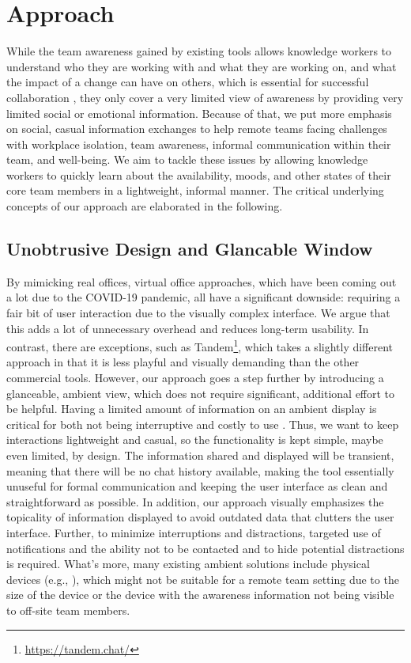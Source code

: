 \chapter{Approach}
\label{chapter:approach}
While the team awareness gained by existing tools allows knowledge workers to understand who they are working with and what they are working on, and what the impact of a change can have on others, which is essential for successful collaboration \autocite{dourish1992awareness}, they only cover a very limited view of awareness by providing very limited social or emotional information. Because of that, we put more emphasis on social, casual information exchanges to help remote teams facing challenges with workplace isolation, team awareness, informal communication within their team, and well-being. We aim to tackle these issues by allowing knowledge workers to quickly learn about the availability, moods, and other states of their core team members in a lightweight, informal manner. The critical underlying concepts of our approach are elaborated in the following.

\section{Unobtrusive Design and Glancable Window}
By mimicking real offices, virtual office approaches, which have been coming out a lot due to the COVID-19 pandemic, all have a significant downside: requiring a fair bit of user interaction due to the visually complex interface. We argue that this adds a lot of unnecessary overhead and reduces long-term usability. In contrast, there are exceptions, such as Tandem\footnote{\url{https://tandem.chat/}}, which takes a slightly different approach in that it is less playful and visually demanding than the other commercial tools. However, our approach goes a step further by introducing a glanceable, ambient view, which does not require significant, additional effort to be helpful. Having a limited amount of information on an ambient display is critical for both not being interruptive and costly to use \autocite{dabbish2004controlling}. Thus, we want to keep interactions lightweight and casual, so the functionality is kept simple, maybe even limited, by design. The information shared and displayed will be transient, meaning that there will be no chat history available, making the tool essentially unuseful for formal communication and keeping the user interface as clean and straightforward as possible. In addition, our approach visually emphasizes the topicality of information displayed to avoid outdated data that clutters the user interface. Further, to minimize interruptions and distractions, targeted use of notifications and the ability not to be contacted and to hide potential distractions is required. What's more, many existing ambient solutions include physical devices (e.g., \autocite{ downs2012ambient, alavi2012ambient, rocker2004using}), which might not be suitable for a remote team setting due to the size of the device or the device with the awareness information not being visible to off-site team members.

